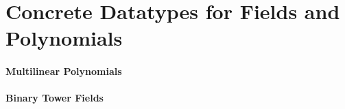 \section{Concrete Datatypes for Fields and Polynomials}


\paragraph{Multilinear Polynomials}


\paragraph{Binary Tower Fields}